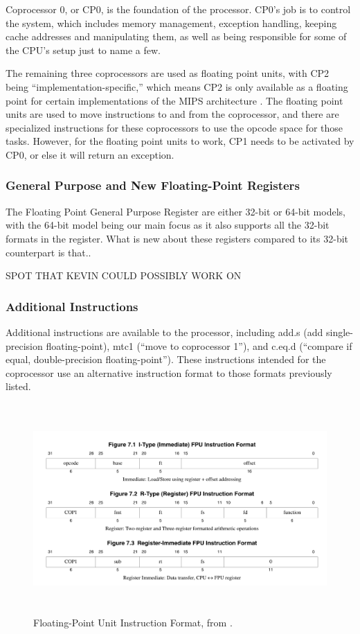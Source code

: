 \documentclass[parskip=half, fontsize=12pt]{scrartcl}
\begin{document}
Coprocessor 0, or CP0, is the foundation of the processor. CP0's job is
to control the system, which includes memory management, exception
handling, keeping cache addresses and manipulating them, as well as
being responsible for some of the CPU's setup just to name a few.

The remaining three coprocessors are used as floating point units, with
CP2 being ``implementation-specific,'' which means CP2 is only available
as a floating point for certain implementations of the MIPS
architecture \cite[p.~74]{mips-specification}. The floating point units are used to move instructions to
and from the coprocessor, and there are specialized instructions for
these coprocessors to use the opcode space for those tasks. However, for
the floating point units to work, CP1 needs to be activated by CP0, or
else it will return an exception.

\subsubsection{General Purpose and New Floating-Point Registers}


The Floating Point General Purpose Register are either 32-bit or 64-bit
models, with the 64-bit model being our main focus as it also supports
all the 32-bit formats in the register. What is new about these
registers compared to its 32-bit counterpart is that..

SPOT THAT KEVIN COULD POSSIBLY WORK ON

\subsubsection{Additional Instructions}

Additional instructions are available to the processor, including add.s
(add single-precision floating-point), mtc1 (``move to coprocessor 1''),
and c.eq.d (``compare if equal, double-precision floating-point''). These
instructions intended for the coprocessor use an alternative instruction
format to those formats previously listed.

\begin{figure}[H]
    \includegraphics[height=8cm]{fpu-instruction-formats}
    \caption{Floating-Point Unit Instruction Format, from \protect\cite{mips-specification}.}
\end{figure}
\end{document}
